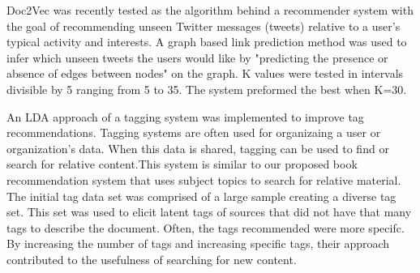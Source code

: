 Doc2Vec was recently tested as the algorithm behind a recommender system with the goal of recommending unseen Twitter messages (tweets) relative to a user's typical activity and interests. A graph based link prediction method was used to infer which unseen tweets the users would like by "predicting the presence or absence of edges between nodes" on the graph.  \cite{RefWorks:doc:5a6e5746e4b0d609eec798d9} K values were tested in intervals divisible by 5 ranging from 5 to 35. The system preformed the best when K=30.

An LDA approach of a tagging system was implemented to improve tag recommendations. \cite{RefWorks:doc:5a73e055e4b0cf1dd767b18f} Tagging systems are often used for organizaing a user or organization's data. When this data is shared, tagging can be used to find or search for relative content.This system is similar to our proposed book recommendation system that uses subject topics to search for relative material. The initial tag data set was comprised of a large sample creating a diverse tag set. This set was used to elicit latent tags of sources that did not have that many tags to describe the document. Often, the tags recommended were more specifc. By increasing the number of tags and increasing specific tags, their approach contributed to the usefulness of searching for new content. 



